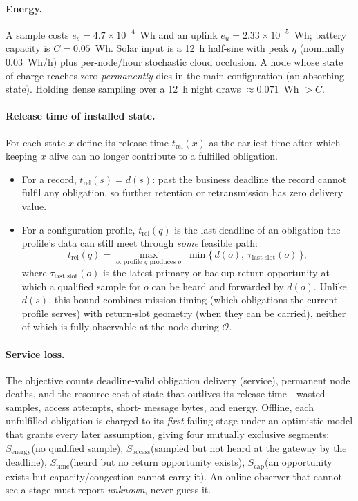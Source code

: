 \documentclass[11pt]{article}
\newcommand{\stime}{$S_{\mathrm{time}}$\xspace}
\newcommand{\scap}{$S_{\mathrm{cap}}$\xspace}
\newcommand{\senergy}{$S_{\mathrm{energy}}$\xspace}
\newcommand{\saccess}{$S_{\mathrm{access}}$\xspace}
\newcommand{\trel}{t_{\mathrm{rel}}}
\begin{document}
\paragraph{Energy.}
A sample costs $e_s{=}4.7{\times}10^{-4}$~Wh and an uplink $e_u{=}2.33{\times}10^{-5}$~Wh; battery
capacity is $C{=}0.05$~Wh. Solar input is a 12~h half-sine with peak $\eta$ (nominally
$0.03$~Wh/h) plus per-node/hour stochastic cloud occlusion. A node whose state of charge reaches
zero \emph{permanently} dies in the main configuration (an absorbing state). Holding dense
sampling over a 12~h night draws $\approx0.071$~Wh $>C$.

\paragraph{Release time of installed state.}
For each state $x$ define its release time $\trel(x)$ as the earliest time after which keeping $x$
alive can no longer contribute to a fulfilled obligation.
\begin{itemize}[leftmargin=*,itemsep=1pt,nosep]
\item For a record, $\trel(s)=d(s)$: past the business deadline the record cannot fulfil any
obligation, so further retention or retransmission has zero delivery value.
\item For a configuration profile, $\trel(q)$ is the last deadline of an obligation the profile's
data can still meet through \emph{some} feasible path:
\begin{equation}
\trel(q)=\max_{o:\,\text{profile }q\text{ produces }o}\;
   \min\{\,d(o),\ \tau_{\text{last slot}}(o)\,\},
\label{eq:trelcfg}
\end{equation}
where $\tau_{\text{last slot}}(o)$ is the latest primary or backup return opportunity at which a
qualified sample for $o$ can be heard and forwarded by $d(o)$. Unlike $d(s)$, this bound combines
mission timing (which obligations the current profile serves) with return-slot geometry (when they
can be carried), neither of which is fully observable at the node during $\mathcal O$.
\end{itemize}

\paragraph{Service loss.}
The objective counts deadline-valid obligation delivery (service), permanent node deaths, and the
resource cost of state that outlives its release time---wasted samples, access attempts, short-
message bytes, and energy. Offline, each unfulfilled obligation is charged to its \emph{first}
failing stage under an optimistic model that grants every later assumption, giving four mutually
exclusive segments: \senergy (no qualified sample), \saccess (sampled but not heard at the gateway
by the deadline), \stime (heard but no return opportunity exists), \scap (an opportunity exists but
capacity/congestion cannot carry it). An online observer that cannot see a stage must report
\emph{unknown}, never guess it.
\end{document}
